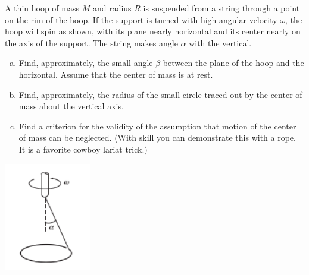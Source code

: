 \documentclass[12pt,letterpaper]{hmcpset}
\begin{document}
\begin{problem}
    A thin hoop of mass $M$ and radius $R$ is suspended 
    from a string through a point on the rim of the hoop.
    If the support is turned with high angular velocity
    $\omega$, the hoop will spin as shown, with its plane 
    nearly horizontal and its center nearly on the axis of
    the support. The string makes angle $\alpha$ with the
    vertical.

    \begin{enumerate}[(a)]
        \item Find, approximately, the small angle $\beta$ between
            the plane of the hoop and the horizontal. Assume that
            the center of mass is at rest.
        \item Find, approximately, the radius of the small circle
            traced out by the center of mass about the vertical axis.
        \item Find a criterion for the validity of the assumption 
            that motion of the center of mass can be neglected. 
            (With skill you can demonstrate this with a rope. It is a
            favorite cowboy lariat trick.)
    \end{enumerate}

    \begin{center}
        \includegraphics[width=1.5in]{img/8_7}
    \end{center}
\end{problem}
\begin{solution}
    \vfill
\end{solution}
\clearpage
\end{document}
